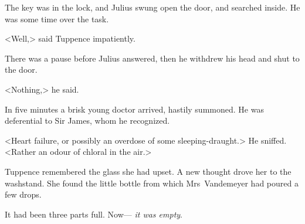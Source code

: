 The key was in the lock, and Julius swung open the door, and searched inside. He was some time over the task.

<Well,> said Tuppence impatiently.

There was a pause before Julius answered, then he withdrew his head and shut to the door.

<Nothing,> he said.

In five minutes a brisk young doctor arrived, hastily summoned. He was deferential to Sir James, whom he recognized.

<Heart failure, or possibly an overdose of some sleeping-draught.> He sniffed. <Rather an odour of chloral in the air.>

Tuppence remembered the glass she had upset. A new thought drove her to the washstand. She found the little bottle from which Mrs~Vandemeyer had poured a few drops.

It had been three parts full. Now— \emph{it was empty}. 